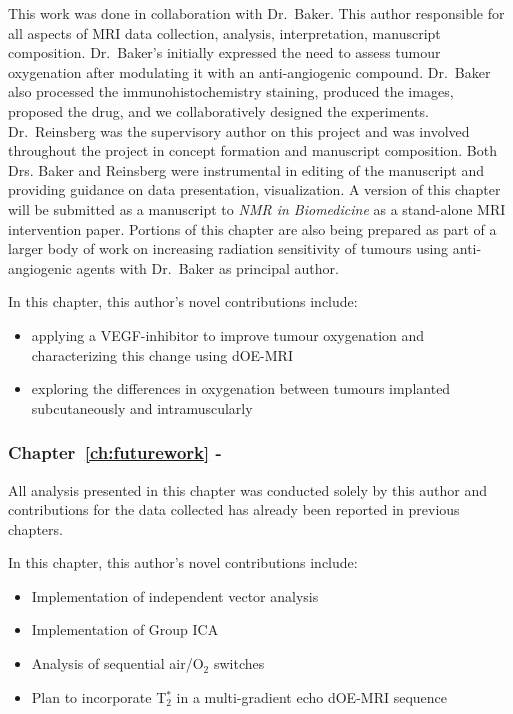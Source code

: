 This work was done in collaboration with Dr.\ Baker.
This author responsible for all aspects of MRI data collection, analysis, interpretation, manuscript composition. 
Dr.\ Baker's initially expressed the need to assess tumour oxygenation after modulating it with an anti-angiogenic compound.
Dr.\ Baker also processed the immunohistochemistry staining, produced the images, proposed the drug, and we collaboratively designed the experiments. 
Dr.\ Reinsberg was the supervisory author on this project and was involved throughout the project in concept formation and manuscript composition. 
Both Drs. Baker and Reinsberg were instrumental in editing of the manuscript and providing guidance on data presentation, visualization.
A version of this chapter will be submitted as a manuscript to \textit{NMR in Biomedicine} as a stand-alone MRI intervention paper.
Portions of this chapter are also being prepared as part of a larger body of work on increasing radiation sensitivity of tumours using anti-angiogenic agents with Dr.\ Baker as principal author.

In this chapter, this author's novel contributions include:

\begin{itemize}
\item applying a VEGF-inhibitor to improve tumour oxygenation and characterizing this change using dOE-MRI
\item exploring the differences in oxygenation between tumours implanted subcutaneously and intramuscularly
\end{itemize}

\subsubsection{Chapter~\ref{ch:futurework} - }

All analysis presented in this chapter was conducted solely by this author and contributions for the data collected has already been reported in previous chapters.

In this chapter, this author's novel contributions include:

\begin{itemize}
\item Implementation of independent vector analysis
\item Implementation of Group ICA
\item Analysis of sequential air/O$_2$ switches
\item Plan to incorporate T$_2^*$ in a multi-gradient echo \acs{dOE-MRI} sequence
\end{itemize}

